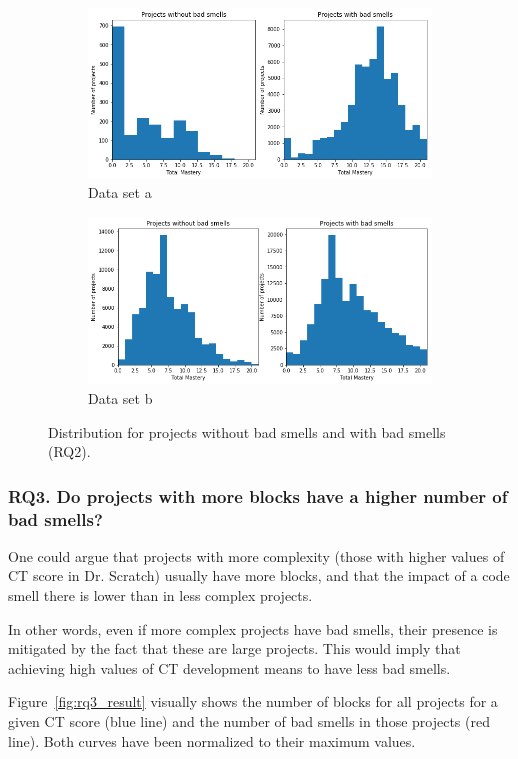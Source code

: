 \begin{figure}
    \centering
    \begin{subfigure}{10cm}
    \includegraphics[width=10cm]{img/rq2_dataset_a.png}
    \caption{Data set a}
    \label{subfig:rq2_results_a}
  \end{subfigure}
  \begin{subfigure}{10cm}
    \includegraphics[width=10cm]{img/rq2_dataset_b.png}
    \caption{Data set b}
    \label{subfig:rq2_results_b}
  \end{subfigure}
    \caption{Distribution for projects without bad smells and with bad smells (RQ2).}
    \label{fig:rq2_result}
\end{figure}


\subsubsection{RQ3. Do projects with more blocks have a higher number of bad smells?}
\label{subsubsec:rq3_results}

One could argue that projects with more complexity (those with higher values of CT score in Dr. Scratch) usually have more blocks, and that the impact of a code smell there is lower than in less complex projects.

In other words, even if more complex projects have bad smells, their presence is mitigated by the fact that these are large projects. This would imply that achieving high values of CT development means to have less bad smells.

Figure~\ref{fig:rq3_result} visually shows the number of blocks for all projects for a given CT score (blue line) and the number of bad smells in those projects (red line). Both curves have been normalized to their maximum values.

